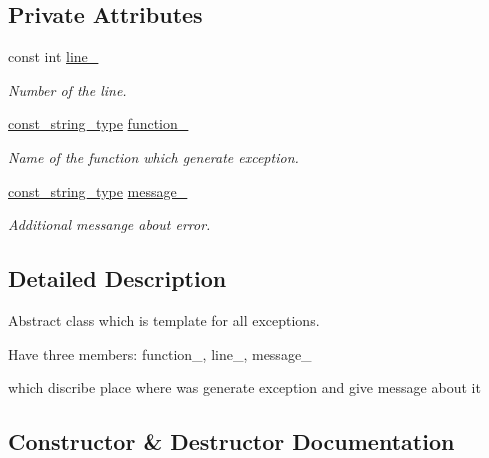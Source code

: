 \subsection*{Private Attributes}
\begin{DoxyCompactItemize}
\item 
\mbox{\label{classatom_1_1error_a8f9a09becabf82e9c407835b310fada8}} 
const int \hyperlink{classatom_1_1error_a8f9a09becabf82e9c407835b310fada8}{line\+\_\+}
\begin{DoxyCompactList}\small\item\em Number of the line. \end{DoxyCompactList}\item 
\mbox{\label{classatom_1_1error_ad0c225c85dd50d88097448212e0f513a}} 
\hyperlink{classatom_1_1error_ac330e9fb7cedcf4a173c5eb156d7bdaf}{const\+\_\+string\+\_\+type} \hyperlink{classatom_1_1error_ad0c225c85dd50d88097448212e0f513a}{function\+\_\+}
\begin{DoxyCompactList}\small\item\em Name of the function which generate exception. \end{DoxyCompactList}\item 
\mbox{\label{classatom_1_1error_a0c32da54f099b6adb57033f21660e04d}} 
\hyperlink{classatom_1_1error_ac330e9fb7cedcf4a173c5eb156d7bdaf}{const\+\_\+string\+\_\+type} \hyperlink{classatom_1_1error_a0c32da54f099b6adb57033f21660e04d}{message\+\_\+}
\begin{DoxyCompactList}\small\item\em Additional messange about error. \end{DoxyCompactList}\end{DoxyCompactItemize}


\subsection{Detailed Description}
Abstract class which is template for all exceptions. 

Have three members\+: function\+\_\+, line\+\_\+, message\+\_\+

which discribe place where was generate exception and give message about it 

\subsection{Constructor \& Destructor Documentation}
\mbox{\label{classatom_1_1error_aef6fb75c74af10599648f701cf8b0844}} 
